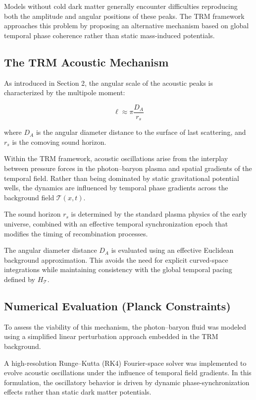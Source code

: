 \documentclass[11pt]{article}
\begin{document}
	Models without cold dark matter generally encounter difficulties reproducing both the amplitude and angular positions of these peaks. The TRM framework approaches this problem by proposing an alternative mechanism based on global temporal phase coherence rather than static mass-induced potentials.

	\subsection{The TRM Acoustic Mechanism}

	As introduced in Section 2, the angular scale of the acoustic peaks is characterized by the multipole moment:

	\begin{equation}
		\ell \approx \pi \frac{D_A}{r_s}
	\end{equation}

	where $D_A$ is the angular diameter distance to the surface of last scattering, and $r_s$ is the comoving sound horizon.

	Within the TRM framework, acoustic oscillations arise from the interplay between pressure forces in the photon--baryon plasma and spatial gradients of the temporal field. Rather than being dominated by static gravitational potential wells, the dynamics are influenced by temporal phase gradients across the background field $\mathcal{T}(x,t)$.

	The sound horizon $r_s$ is determined by the standard plasma physics of the early universe, combined with an effective temporal synchronization epoch that modifies the timing of recombination processes.

	The angular diameter distance $D_A$ is evaluated using an effective Euclidean background approximation. This avoids the need for explicit curved-space integrations while maintaining consistency with the global temporal pacing defined by $H_{\mathcal{T}}$.

	\subsection{Numerical Evaluation (Planck Constraints)}

	To assess the viability of this mechanism, the photon--baryon fluid was modeled using a simplified linear perturbation approach embedded in the TRM background.

	A high-resolution Runge--Kutta (RK4) Fourier-space solver was implemented to evolve acoustic oscillations under the influence of temporal field gradients. In this formulation, the oscillatory behavior is driven by dynamic phase-synchronization effects rather than static dark matter potentials.
\end{document}

